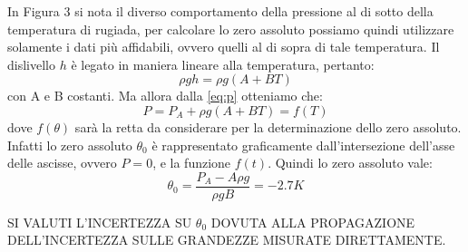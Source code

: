 In Figura 3 si nota il diverso comportamento della pressione al di sotto della temperatura di rugiada, per calcolare lo zero assoluto possiamo quindi utilizzare solamente i dati più affidabili, ovvero quelli al di sopra di tale temperatura.
Il dislivello $h$ è legato in maniera lineare alla temperatura, pertanto:
\begin{equation}
\rho gh = \rho g (A + B T)
\end{equation}
con A e B costanti.
Ma allora dalla \eqref{eq:p} otteniamo che:
\begin{equation}
P = P_A + \rho g (A + B T) = f (T)
\end{equation}
dove $f(\theta)$ sarà la retta da considerare per la determinazione dello zero assoluto.
Infatti lo zero assoluto $\theta_0$ è rappresentato graficamente dall'intersezione dell'asse delle ascisse, ovvero $P = 0$, e la funzione $f(t)$.
Quindi lo zero assoluto vale: 
\begin{equation}
\theta_0 = \frac{P_A - A \rho g}{\rho gB} = -2.7 K
\end{equation}

SI VALUTI L'INCERTEZZA SU $\theta_0$ DOVUTA ALLA PROPAGAZIONE DELL'INCERTEZZA SULLE GRANDEZZE MISURATE DIRETTAMENTE.